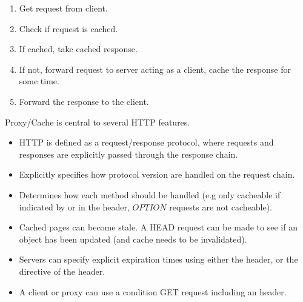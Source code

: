 \begin{enumerate}
    \setlength\itemsep{0em}
    \item Get request from client.
    \item Check if request is cached.
    \item If cached, take cached response.
    \item If not, forward request to server acting as a client, cache the response for some time.
    \item Forward the response to the client.
\end{enumerate}

Proxy/Cache is central to several HTTP features.
\begin{itemize}
    \setlength\itemsep{0em}
    \item HTTP is defined as a request/response protocol, where requests and responses are explicitly passed through the response chain.
    \item Explicitly specifies how protocol version are handled on the request chain.
    \item Determines how each method should be handled (e.g only cacheable if indicated by  or  in the header, $OPTION$ requests are not cacheable).
    \item Cached pages can become stale. A HEAD request can be made to see if an object has been updated (and cache needs to be invalidated).
    \item Servers can specify explicit expiration times using either the  header, or the  directive of the  header.
    \item A client or proxy can use a condition GET request including an  header.
\end{itemize}
